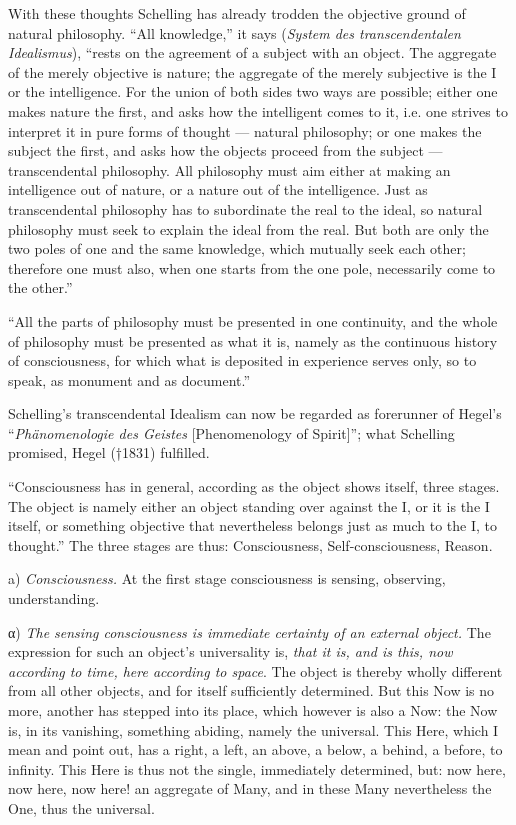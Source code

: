 \documentclass[12pt]{book}
\begin{document}
With these thoughts Schelling has already trodden the objective ground of natural
philosophy. ``All knowledge,'' it says (\textit{System des transcendentalen
Idealismus}), ``rests on the agreement of a subject with an object. The aggregate
of the merely objective is nature; the aggregate of the merely subjective is the I
or the intelligence. For the union of both sides two ways are possible; either one
makes nature the first, and asks how the intelligent comes to it,
i.e. one strives to interpret it in pure forms of thought --- natural philosophy;
or one makes the subject the first, and asks how the objects proceed from the
subject --- transcendental philosophy. All philosophy must aim either at making an
intelligence out of nature, or a nature out of the intelligence. Just as
transcendental philosophy has to subordinate the real to the ideal, so natural
philosophy must seek to explain the ideal from the real. But both are only the two
poles of one and the same knowledge, which mutually seek each other; therefore one
must also, when one starts from the one pole, necessarily come to the other.''

``All the parts of philosophy must be presented in one continuity, and the whole
of philosophy must be presented as what it is, namely as the continuous history of
consciousness, for which what is deposited in experience serves only, so to speak,
as monument and as document.''

Schelling's transcendental Idealism can now be regarded as forerunner of Hegel's
``\textit{Phänomenologie des Geistes} [Phenomenology of Spirit]''; what Schelling
promised, Hegel (†1831) fulfilled.

``Consciousness has in general, according as the object shows itself, three stages.
The object is namely either an object standing over against the I, or it is the I
itself, or something objective that nevertheless belongs just as much to the I, to
thought.'' The three stages are thus: Consciousness, Self-consciousness, Reason.

a) \emph{Consciousness.} At the first stage consciousness is sensing, observing,
understanding.

α) \emph{The sensing consciousness is immediate certainty of an external object.}
The expression for such an object's universality is, \emph{that it is, and is this,
now according to time, here according to space}. The object is thereby wholly
different from all other objects, and for itself sufficiently determined. But this
Now is no more, another has stepped into its place, which however is also a Now:
the Now
is, in its vanishing, something abiding, namely the universal. This Here, which I
mean and point out, has a right, a left, an above, a below, a behind, a before, to
infinity. This Here is thus not the single, immediately determined, but: now here,
now here, now here! an aggregate of Many, and in these Many nevertheless the One,
thus the universal.
\end{document}
